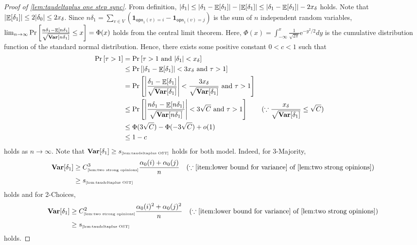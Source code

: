 \documentclass[letterpaper,11pt]{article}
\newcommand{\indicator}{\mathbf{1}}
\DeclareMathOperator*{\E}{\mathbb{E}}
\DeclareMathOperator*{\Var}{\mathbf{Var}}
\newcommand{\e}{\mathrm{e}}
\newcommand{\constref}[1]{C_{\mbox{\tiny\ref{#1}}}}
\newcommand{\varianceref}[1]{\variance_{\mbox{\tiny\ref{#1}}}}
\newcommand{\calphadown}{c^{\downarrow}_\alpha}
\newcommand{\opinion}{\mathsf{opn}}
\newcommand{\variance}{s}
\newcommand{\tauidown}{\tau^{\downarrow}_i}
\newcommand{\taujdown}{\tau^{\downarrow}_j}
\newcommand{\xdelta}{x_{\delta}}
\begin{document}
\begin{proof}[Proof of \cref{lem:taudeltaplus one step sync}]
    From definition, $\abs{\delta_1}\leq \abs{\delta_1-\E[\delta_1]}-\abs{\E[\delta_1]}\leq \abs{\delta_1-\E[\delta_1]}-2\xdelta$ holds.
    Note that $\abs{\E[\delta_1]}\leq 2\abs{\delta_0}\leq 2\xdelta$.
    Since $n\delta_1=\sum_{v\in V}(\indicator_{\opinion_1(v)=i}-\indicator_{\opinion_1(v)=j})$ is the sum of $n$ independent random variables, $\lim_{n\to \infty}\Pr\qty[\frac{n\delta_1-\E[n\delta_1]}{\sqrt{\Var[n\delta_1]}}\leq x]=\Phi(x)$ holds from the central limit theorem.
    Here, $\Phi(x)=\int_{-\infty}^x \frac{1}{\sqrt{2\pi}}\e^{-y^2/2}dy$ is the cumulative distribution function of the standard normal distribution.
    Hence, there exists some positive constant $0<c<1$ such that
\begin{align*}
\Pr\qty[\tau>1]
&= \Pr\qty[\tau>1\textrm{ and }\abs{\delta_1}<\xdelta]\\
&\leq \Pr\qty[\abs{\delta_1-\E[\delta_1]}<3\xdelta \textrm{ and }\tau>1]\\
&=\Pr\qty[\abs{\frac{\delta_1-\E[\delta_1]}{\sqrt{\Var[\delta_1]}}}<\frac{3\xdelta}{\sqrt{\Var[\delta_1]}}\textrm{ and }\tau>1]\\
&\leq \Pr\qty[\abs{\frac{n\delta_1-\E[n\delta_1]}{\sqrt{\Var[n\delta_1]}}}<3\sqrt{C}\textrm{ and }\tau>1]
&&(\because \frac{x_\delta}{\sqrt{\Var[\delta_1]}}\leq \sqrt{C})\\
&\leq \Phi(3\sqrt{C})-\Phi(-3\sqrt{C})+o(1)\\
&\leq 1-c
\end{align*}
holds as $n\to \infty$.
Note that $\Var[\delta_1]\geq \varianceref{lem:taudeltaplus OST}$ holds for both model.
Indeed, for 3-Majority, 
\begin{align*}
    \Var[\delta_1]
    &\geq \constref{lem:two strong opinions}^3\frac{\alpha_{0}(i)+\alpha_{0}(j)}{n} &&(\because \textrm{\cref{item:lower bound for variance} of \cref{lem:two strong opinions}}) \nonumber\\
    &\geq \varianceref{lem:taudeltaplus OST}
\end{align*}
holds and for 2-Choices, 
\begin{align*}
    \Var[\delta_1]
    &\geq \constref{lem:two strong opinions}^2\frac{\alpha_{0}(i)^2+\alpha_{0}(j)^2}{n} &&(\because \textrm{\cref{item:lower bound for variance} of \cref{lem:two strong opinions}}) \nonumber\\
    &\geq \varianceref{lem:taudeltaplus OST}
\end{align*}
holds.
\end{proof}
\end{document}
